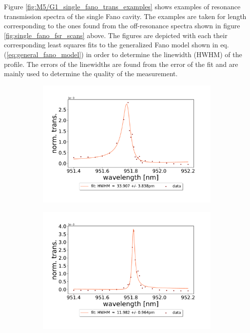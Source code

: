 Figure \ref{fig:M5/G1_single_fano_trans_examples} shows examples of resonance transmission spectra of the single Fano cavity. The examples are taken for length corresponding to the ones found from the off-resonance spectra shown in figure \ref{fig:single_fano_fsr_scans} above. The figures are depicted with each their corresponding least squares fits to the generalized Fano model shown in eq. (\ref{eq:general_fano_model}) in order to determine the linewidth (HWHM) of the profile. The errors of the linewidths are found from the error of the fit and are mainly used to determine the quality of the measurement. 

\begin{figure}[h!]
    \centering
    \begin{subfigure}[b]{0.49\textwidth}
        \centering
        \includegraphics[width=\textwidth]{figures/results/single fano fits/60um_M5_fit_1.pdf}
        \caption{}
        \label{fig:short_single_fano_trans}
    \end{subfigure}
    \begin{subfigure}[b]{0.49\textwidth}
        \centering
        \includegraphics[width=\textwidth]{figures/results/single fano fits/220um_M5_fit_4.pdf}

\end{subfigure}
\end{figure}
